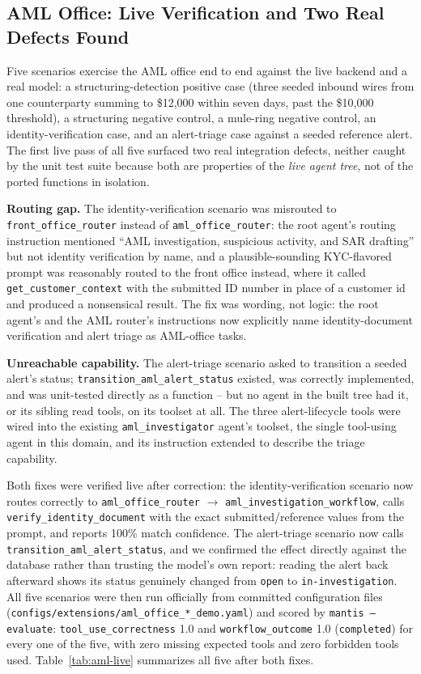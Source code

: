 \documentclass[conference]{IEEEtran}
\begin{document}
\subsection{AML Office: Live Verification and Two Real Defects Found}
\label{sec:exp-aml}

Five scenarios exercise the AML office end to end against the live backend and a real model: a structuring-detection positive case (three seeded inbound wires from one counterparty summing to \$12{,}000 within seven days, past the \$10{,}000 threshold), a structuring negative control, a mule-ring negative control, an identity-verification case, and an alert-triage case against a seeded reference alert. The first live pass of all five surfaced two real integration defects, neither caught by the unit test suite because both are properties of the \emph{live agent tree}, not of the ported functions in isolation.

\textbf{Routing gap.} The identity-verification scenario was misrouted to \texttt{front\_office\_router} instead of \texttt{aml\_office\_router}: the root agent's routing instruction mentioned ``AML investigation, suspicious activity, and SAR drafting'' but not identity verification by name, and a plausible-sounding KYC-flavored prompt was reasonably routed to the front office instead, where it called \texttt{get\_customer\_context} with the submitted ID number in place of a customer id and produced a nonsensical result. The fix was wording, not logic: the root agent's and the AML router's instructions now explicitly name identity-document verification and alert triage as AML-office tasks.

\textbf{Unreachable capability.} The alert-triage scenario asked to transition a seeded alert's status; \texttt{transition\_aml\_alert\_status} existed, was correctly implemented, and was unit-tested directly as a function -- but no agent in the built tree had it, or its sibling read tools, on its toolset at all. The three alert-lifecycle tools were wired into the existing \texttt{aml\_investigator} agent's toolset, the single tool-using agent in this domain, and its instruction extended to describe the triage capability.

Both fixes were verified live after correction: the identity-verification scenario now routes correctly to \texttt{aml\_office\_router} $\rightarrow$ \texttt{aml\_investigation\_workflow}, calls \texttt{verify\_identity\_document} with the exact submitted/reference values from the prompt, and reports 100\% match confidence. The alert-triage scenario now calls \texttt{transition\_aml\_alert\_status}, and we confirmed the effect directly against the database rather than trusting the model's own report: reading the alert back afterward shows its status genuinely changed from \texttt{open} to \texttt{in-investigation}. All five scenarios were then run officially from committed configuration files (\texttt{configs/extensions/aml\_office\_*\_demo.yaml}) and scored by \texttt{mantis --evaluate}: \texttt{tool\_use\_correctness} 1.0 and \texttt{workflow\_outcome} 1.0 (\texttt{completed}) for every one of the five, with zero missing expected tools and zero forbidden tools used. Table~\ref{tab:aml-live} summarizes all five after both fixes.
\end{document}
